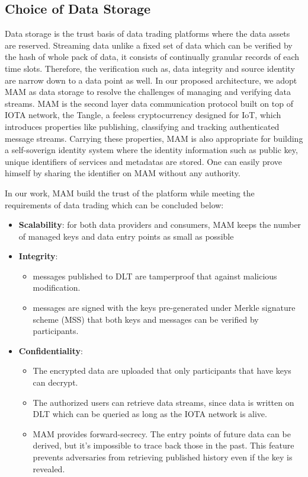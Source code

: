 \documentclass[conference]{IEEEtran}
\begin{document}
\subsection{Choice of Data Storage}
Data storage is the trust basis of data trading platforms where the data assets are reserved. Streaming data unlike a fixed set of data which can be verified by the hash of whole pack of data, it consists of continually granular records of each time slots. Therefore, the verification such as, data integrity and source identity are narrow down to a data point as well. In our proposed architecture, we adopt MAM as data storage to resolve the challenges of managing and verifying data streams. MAM is the second layer data communication protocol built on top of IOTA\cite{IOTAwhitepaper} network, the Tangle, a feeless cryptocurrency designed for IoT, which introduces properties like publishing, classifying and tracking authenticated message streams. Carrying these properties, MAM is also appropriate for building a self-soverign identity system where the identity information such as public key, unique identifiers of services and metadatas are stored. One can easily prove himself by sharing the identifier on MAM without any authority. 

In our work, MAM build the trust of the platform while meeting the requirements of data trading which can be concluded below:

\begin{itemize}
    \item \textbf{Scalability}: for both data providers and consumers, MAM keeps the number of managed keys and data entry points as small as possible
    \item \textbf{Integrity}: 
	\begin{itemize}    	
    	\item messages published to DLT are tamperproof that against malicious modification. 
    	\item messages are signed with the keys pre-generated under Merkle signature scheme\cite{MSS} (MSS) that both keys and messages can be verified by participants.
    \end{itemize}
    \item \textbf{Confidentiality}:
    \begin{itemize}    	
    	\item The encrypted data are uploaded that only participants that have keys can decrypt. 
    	\item The authorized users can retrieve data streams, since data is written on DLT which can be queried as long as the IOTA network is alive.
    	\item MAM provides forward-secrecy. The entry points of future data can be derived, but it's impossible to trace back those in the past. This feature prevents adversaries from retrieving published history even if the key is revealed.
    \end{itemize}
\end{itemize}
\end{document}
